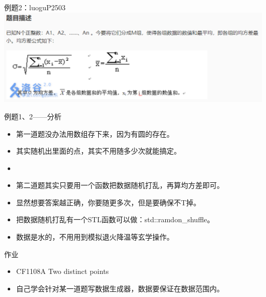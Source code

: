 \documentclass{beamer}[UTF-8]
\begin{document}
\begin{frame}{例题2：luoguP2503}
\includegraphics{luoguP2503.png}
\end{frame}

\begin{frame}{例题1、2——分析}
 \pause
\begin{itemize}
\item 第一道题没办法用数组存下来，因为有圆的存在。 \pause
\item 其实随机出里面的点，其实不用随多少次就能搞定。 \pause
\item
\item 第二道题其实只要用一个函数把数据随机打乱，再算均方差即可。 \pause
\item 显然想要答案越正确，你要随更多次，但是要确保不T掉。 \pause
\item 把数据随机打乱有一个STL函数可以做：std::ramdon\_shuffle。 \pause
\item 数据是水的，不用用到模拟退火降温等玄学操作。
\end{itemize}
\end{frame}

\begin{frame}{作业}
 \pause
\begin{itemize}
\item CF1108A Two distinct points
\item 自己学会针对某一道题写数据生成器，数据要保证在数据范围内。
\end{itemize}
\end{frame}
\end{document}
